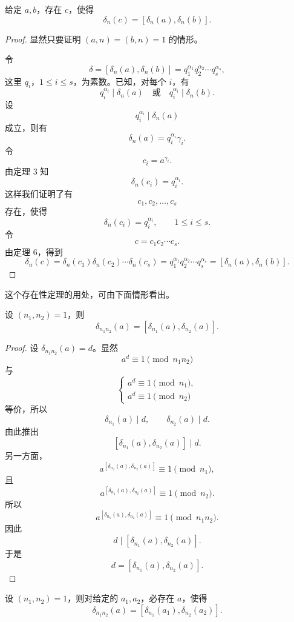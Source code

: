 \begin{theorem}[原文 定理 7]
	给定 $a,b$，存在 $c$，使得
	\[
		\delta_n(c)=[\delta_n(a),\delta_n(b)].
	\]
\end{theorem}

\begin{proof}
	显然只要证明 $(a,n)=(b,n)=1$ 的情形。

	令
	\[
		\delta=[\delta_n(a),\delta_n(b)]
		=
		q_1^{\alpha_1}q_2^{\alpha_2}\cdots q_s^{\alpha_s},
	\]
	这里 $q_i$，$1\leq i\leq s$，为素数。已知，对每个 $i$，有
	\[
		q_i^{\alpha_i}\mid \delta_n(a)
		\quad\text{或}\quad
		q_i^{\alpha_i}\mid \delta_n(b).
	\]
	设
	\[
		q_i^{\alpha_i}\mid \delta_n(a)
	\]
	成立，则有
	\[
		\delta_n(a)=q_i^{\alpha_i}\gamma_i.
	\]
	令
	\[
		c_i=a^{\gamma_i}.
	\]
	由定理 3 知
	\[
		\delta_n(c_i)=q_i^{\alpha_i}.
	\]
	这样我们证明了有
	\[
		c_1,c_2,\ldots,c_s
	\]
	存在，使得
	\[
		\delta_n(c_i)=q_i^{\alpha_i},
		\qquad 1\leq i\leq s.
	\]
	令
	\[
		c=c_1c_2\cdots c_s.
	\]
	由定理 6，得到
	\[
		\delta_n(c)=\delta_n(c_1)\delta_n(c_2)\cdots\delta_n(c_s)
		=
		q_1^{\alpha_1}q_2^{\alpha_2}\cdots q_s^{\alpha_s}
		=
		[\delta_n(a),\delta_n(b)].
	\]
\end{proof}

这个存在性定理的用处，可由下面情形看出。

\begin{theorem}[原文 定理 8]
	设 $(n_1,n_2)=1$，则
	\[
		\delta_{n_1n_2}(a)=[\delta_{n_1}(a),\delta_{n_2}(a)].
	\]
\end{theorem}

\begin{proof}
	设 $\delta_{n_1n_2}(a)=d$。显然
	\[
		a^d\equiv 1\pmod {n_1n_2}
	\]
	与
	\[
	\begin{cases}
		a^d\equiv 1\pmod {n_1},\\
		a^d\equiv 1\pmod {n_2}
	\end{cases}
	\]
	等价，所以
	\[
		\delta_{n_1}(a)\mid d,\qquad \delta_{n_2}(a)\mid d.
	\]
	由此推出
	\[
		[\delta_{n_1}(a),\delta_{n_2}(a)]\mid d.
	\]
	另一方面，
	\[
		a^{[\delta_{n_1}(a),\delta_{n_2}(a)]}\equiv 1\pmod {n_1},
	\]
	且
	\[
		a^{[\delta_{n_1}(a),\delta_{n_2}(a)]}\equiv 1\pmod {n_2}.
	\]
	所以
	\[
		a^{[\delta_{n_1}(a),\delta_{n_2}(a)]}\equiv 1\pmod {n_1n_2}.
	\]
	因此
	\[
		d\mid [\delta_{n_1}(a),\delta_{n_2}(a)].
	\]
	于是
	\[
		d=[\delta_{n_1}(a),\delta_{n_2}(a)].
	\]
\end{proof}

\begin{theorem}[原文 定理 9]
	设 $(n_1,n_2)=1$，则对给定的 $a_1,a_2$，必存在 $a$，使得
	\[
		\delta_{n_1n_2}(a)=[\delta_{n_1}(a_1),\delta_{n_2}(a_2)].
	\]
\end{theorem}

